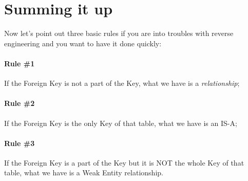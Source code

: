 \documentclass[class=book, crop=false, oneside]{standalone}
\begin{document}
\section{Summing it up}
Now let's point out three basic rules if you are into troubles with reverse engineering and you want to have it done quickly:
\paragraph{Rule \#1} If the Foreign Key is not a part of the Key, what we have is a \emph{relationship};
\paragraph{Rule \#2} If the Foreign Key is the only Key of that table, what we have is an IS-A;
\paragraph{Rule \#3} If the Foreign Key is a part of the Key but it is NOT the whole Key of that table, what we have is a Weak Entity relationship.
\end{document}
